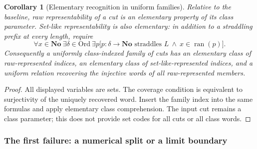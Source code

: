 \documentclass[11pt]{article}
\newtheorem{corollary}[corollary]{Corollary}
\theoremstyle{definition}
\theoremstyle{remark}
\newcommand{\No}{\mathbf{No}}
\newcommand{\Ord}{\mathrm{Ord}}
\begin{document}
\begin{corollary}[Elementary recognition in uniform families]
\label{swo:sh:cor:elementary-cut-recognition}
Relative to the baseline, raw representability of a cut is an
elementary property of its class parameter.  Set-like representability
is also elementary: in addition to a straddling prefix at every length,
require
\[
 \forall x\in\No\ \exists\delta\in\Ord\ \exists p
 \bigl[p:\delta\to\No\text{ straddles }L
       \ \wedge\ x\in\operatorname{ran}(p)\bigr].
\]
Consequently a uniformly class-indexed family of cuts has an
elementary class of raw-represented indices, an elementary class of
set-like-represented indices, and a uniform relation recovering the
injective words of all raw-represented members.
\end{corollary}
\begin{proof}
All displayed variables are sets.  The coverage condition is
equivalent to surjectivity of the uniquely recovered word.
Insert the family index into the same formulas and apply elementary
class comprehension.  The input cut remains a class parameter;
this does not provide set codes for all cuts or all class words.
\end{proof}

\subsubsection{The first failure: a numerical split or a limit boundary}
\end{document}
